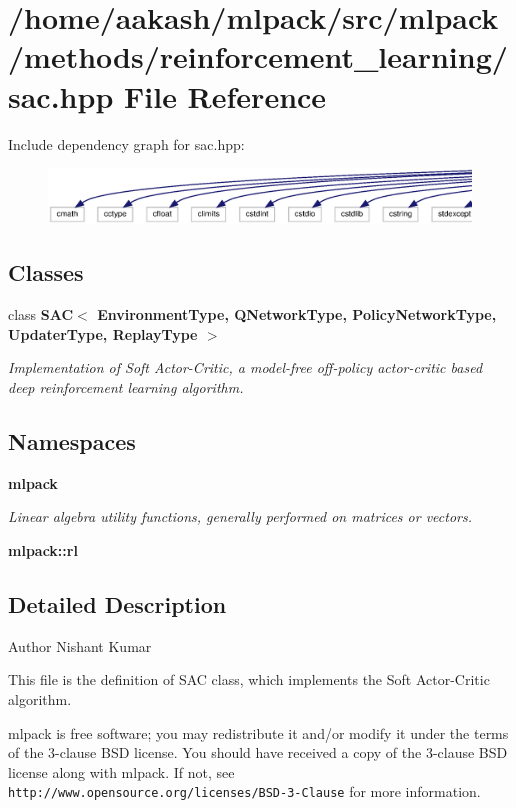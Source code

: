 \section{/home/aakash/mlpack/src/mlpack/methods/reinforcement\+\_\+learning/sac.hpp File Reference}
\label{sac_8hpp}
Include dependency graph for sac.\+hpp\+:
\nopagebreak
\begin{figure}[H]
\begin{center}
\leavevmode
\includegraphics[width=350pt]{sac_8hpp__incl}
\end{center}
\end{figure}
\subsection*{Classes}
\begin{DoxyCompactItemize}
\item 
class \textbf{ S\+A\+C$<$ Environment\+Type, Q\+Network\+Type, Policy\+Network\+Type, Updater\+Type, Replay\+Type $>$}
\begin{DoxyCompactList}\small\item\em Implementation of Soft Actor-\/\+Critic, a model-\/free off-\/policy actor-\/critic based deep reinforcement learning algorithm. \end{DoxyCompactList}\end{DoxyCompactItemize}
\subsection*{Namespaces}
\begin{DoxyCompactItemize}
\item 
 \textbf{ mlpack}
\begin{DoxyCompactList}\small\item\em Linear algebra utility functions, generally performed on matrices or vectors. \end{DoxyCompactList}\item 
 \textbf{ mlpack\+::rl}
\end{DoxyCompactItemize}


\subsection{Detailed Description}
\begin{DoxyAuthor}{Author}
Nishant Kumar
\end{DoxyAuthor}
This file is the definition of S\+AC class, which implements the Soft Actor-\/\+Critic algorithm.

mlpack is free software; you may redistribute it and/or modify it under the terms of the 3-\/clause B\+SD license. You should have received a copy of the 3-\/clause B\+SD license along with mlpack. If not, see {\tt http\+://www.\+opensource.\+org/licenses/\+B\+S\+D-\/3-\/\+Clause} for more information. 